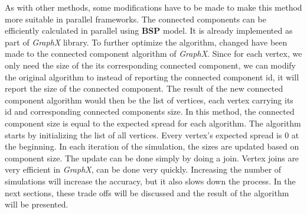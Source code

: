 \documentclass[english]{tktltiki}
\begin{document}
As with other methods, some modifications have to be made to make this method more suitable in parallel frameworks. The connected components can be efficiently calculated in parallel using \textbf{BSP} model. It is already implemented as part of \textit{GraphX} library. To further optimize the algorithm, changed have been made to the connected component algorithm of \textit{GraphX}. Since for each vertex, we only need the size of the its corresponding connected component, we can modify the original algorithm to instead of reporting the connected component id, it will report the size of the connected component. The result of the new connected component algorithm would then be the list of vertices, each vertex carrying its id and corresponding connected components size. In this method, the connected component size is equal to the expected spread for each algorithm. The algorithm starts by initializing the list of all vertices. Every vertex's expected spread is 0 at the beginning. In each iteration of the simulation, the sizes are updated based on component size. The update can be done simply by doing a join. Vertex joins are very efficient in \textit{GraphX}, can be done very quickly. Increasing the number of simulations will increase the accuracy, but it also slows down the process. In the next sections, these trade offs will be discussed and the result of the algorithm will be presented.
\end{document}
